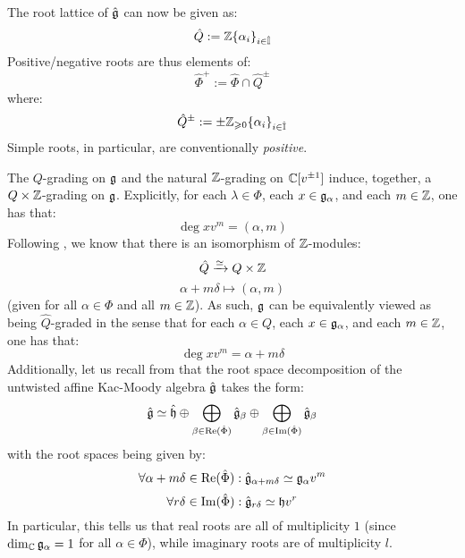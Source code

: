         The root lattice of $\hat{\mathfrak{g}}$ can now be given as:
            $$\hat{Q} := \mathbb{Z}\{\alpha_i\}_{i \in \hat{\mathbb{I}}}$$
        Positive/negative roots are thus elements of:
            $$\hat{\Phi}^+ := \hat{\Phi} \cap \hat{Q}^{\pm}$$
        where:
            $$\hat{Q}^{\pm} := \pm\mathbb{Z}_{\geqslant 0}\{\alpha_i\}_{i \in \hat{\mathbb{I}}}$$
        Simple roots, in particular, are conventionally \textit{positive}.

        The $Q$-grading on $\mathfrak{g}$ and the natural $\mathbb{Z}$-grading on $\mathbb{C}[v^{\pm 1}]$ induce, together, a $Q \x \Z$-grading on $\mathfrak{g}$. Explicitly, for each $\lambda \in \Phi$, each $x \in \mathfrak{g}_{\alpha}$, and each $m \in \mathbb{Z}$, one has that:
            $$\deg x v^m = (\alpha, m)$$
        Following \cite[Chapter 6]{kac_infinite_dimensional_lie_algebras}, we know that there is an isomorphism of $\mathbb{Z}$-modules:
            $$\hat{Q} \xrightarrow[]{\cong} Q \x \Z$$
            $$\alpha + m\delta \mapsto (\alpha, m)$$
        (given for all $\alpha \in \Phi$ and all $m \in \mathbb{Z}$). As such, $\mathfrak{g}$ can be equivalently viewed as being $\hat{Q}$-graded in the sense that for each $\alpha \in Q$, each $x \in \mathfrak{g}_{\alpha}$, and each $m \in \mathbb{Z}$, one has that:
            $$\deg x v^m = \alpha + m\delta$$
        Additionally, let us recall from \cite[Chapter 7]{kac_infinite_dimensional_lie_algebras} that the root space decomposition of the untwisted affine Kac-Moody algebra $\hat{\mathfrak{g}}$ takes the form:
            $$\hat{\mathfrak{g}} \simeq \hat{\mathfrak{h}} \oplus \bigoplus_{\beta \in \operatorname{Re}(\hat{\Phi})} \hat{\mathfrak{g}}_{\beta} \oplus \bigoplus_{\beta \in \operatorname{Im}(\hat{\Phi})} \hat{\mathfrak{g}}_{\beta}$$
        with the root spaces being given by:
            $$\forall \alpha + m\delta \in \operatorname{Re}(\hat{\Phi}): \hat{\mathfrak{g}}_{\alpha + m\delta} \simeq \mathfrak{g}_{\alpha} v^m$$
            $$\forall r\delta \in \operatorname{Im}(\hat{\Phi}): \hat{\mathfrak{g}}_{r\delta} \simeq \mathfrak{h} v^r$$
        In particular, this tells us that real roots are all of multiplicity $1$ (since $\dim_{\mathbb{C}} \mathfrak{g}_{\alpha} = 1$ for all $\alpha \in \Phi$), while imaginary roots are of multiplicity $l$.
            
